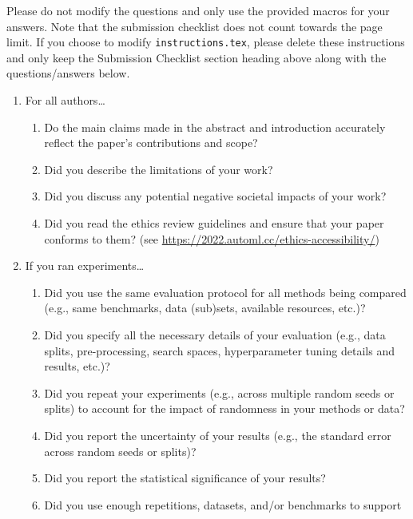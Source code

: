 \documentclass[11pt]{article}
\begin{document}
Please do not modify the questions and only use the provided macros for your
answers. Note that the submission checklist does not count towards the page
limit. If you choose to modify \texttt{instructions.tex}, please delete these
instructions and only keep the Submission Checklist section heading above along
with the questions/answers below.

\begin{enumerate}
\item For all authors\dots
  \begin{enumerate}
  \item Do the main claims made in the abstract and introduction accurately
    reflect the paper's contributions and scope?
    \answerTODO{}
  \item Did you describe the limitations of your work?
    \answerTODO{}
  \item Did you discuss any potential negative societal impacts of your work?
    \answerTODO{}
  \item Did you read the ethics review guidelines and ensure that your paper
    conforms to them? (see \url{https://2022.automl.cc/ethics-accessibility/})
    \answerTODO{}
  \end{enumerate}
\item If you ran experiments\dots
  \begin{enumerate}
  \item Did you use the same evaluation protocol for all methods being compared (e.g.,
    same benchmarks, data (sub)sets, available resources, etc.)?
    \answerTODO{}
  \item Did you specify all the necessary details of your evaluation (e.g., data splits,
    pre-processing, search spaces, hyperparameter tuning details and results, etc.)?
    \answerTODO{}
  \item Did you repeat your experiments (e.g., across multiple random seeds or
    splits) to account for the impact of randomness in your methods or data?
    \answerTODO{}
  \item Did you report the uncertainty of your results (e.g., the standard error
    across random seeds or splits)?
    \answerTODO{}
  \item Did you report the statistical significance of your results?
    \answerTODO{}
  \item Did you use enough repetitions, datasets, and/or benchmarks to support

\end{enumerate}
\end{enumerate}
\end{document}
